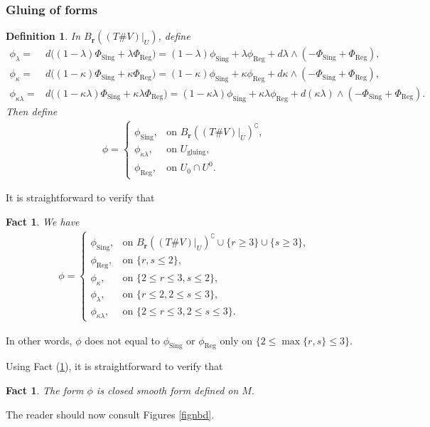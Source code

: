 \documentclass[11pt,a4paper]{amsart}
\numberwithin{equation}{section}
\newcommand{\reg}{{\operatorname{Reg}}}
\newcommand{\sing}{{\operatorname{Sing}}}
\newcommand{\lam}{\lambda}
\newcommand{\ug}{U_{\operatorname{gluing}}}
\newcommand{\cp}{^\complement}
\newcommand{\ka}{\kappa}
\newcommand{\w}{\wedge}
\newcommand{\mfr}{{\mathbf{r}}}
\newcommand{\tvu}{(T\#V)|_U}
\newcommand{\ur}{B_{\mfr}(\tvu)}
\theoremstyle{plain}
\newtheorem{fact}[exam]{Fact}
\newtheorem{defn}[exam]{Definition}
\theoremstyle{definition}
\numberwithin{equation}{subsection}
\begin{document}
	\subsubsection{Gluing of forms}
	\begin{defn}
		In $\ur$, define
		\begin{align}
			\phi_\lam=&	d\big((1-\lam)\Phi_\sing+\lam\Phi_\reg\big)=(1-\lam)\phi_\sing+\lam\phi_\reg+d\lam\w (-\Phi_\sing+\Phi_\reg),\\
			\phi_{\ka}=&d\big((1-\ka)\Phi_\sing+\ka\Phi_\reg\big)=(1-\ka)\phi_\sing+\ka\phi_\reg+d\ka\w (-\Phi_\sing+\Phi_\reg),\\
			\label{defnpkl}	\phi_{\ka\lam}=&d\big((1-\ka\lam)\Phi_\sing+\ka\lam\Phi_\reg\big)=(1-\ka\lam)\phi_\sing+\ka\lam\phi_\reg+d(\ka\lam)\w (-\Phi_\sing+\Phi_\reg).	
		\end{align}
		Then define
		\begin{align}\label{defp}	
			\phi=
			\begin{cases}
				\phi_\sing,&\text{on }B_\mfr(\tvu)\cp,\\
				\phi_{\ka\lam},&\text{on }\ug,\\
				\phi_\reg,&\text{on }U_0\cap U^0.
			\end{cases}
		\end{align}
	\end{defn}It is straightforward to verify that
	\begin{fact}\label{fctpp}
		We have\begin{align}\label{defpp}	
			\phi=
			\begin{cases}
				\phi_\sing,&\text{on }B_\mfr(\tvu)\cp\cup\{r\ge 3\}\cup\{s\ge 3\},\\
				\phi_\reg,&\text{on }\{r,s\le 2\},\\
				\phi_\ka,&\text{on }\{2\le r\le 3,s\le 2\},\\
				\phi_\lam,&\text{on }\{ r\le 2,2\le s\le 3\},\\
				\phi_{\ka\lam},&\text{on }\{2\le r\le 3,2\le s\le 3\}.		
			\end{cases}
		\end{align}
	\end{fact}
	In other words, $\phi$ does not equal to $\phi_\sing$ or $\phi_\reg$ only on $\{2\le \max\{r,s\}\le 3\}.$
	
	Using Fact (\ref{fctpp}), it is straightforward to verify that
	\begin{fact}
		The form $\phi$ is closed smooth form defined on $M.$  
	\end{fact}	
	The reader should now consult Figures \ref{fignbd}.
\end{document}
